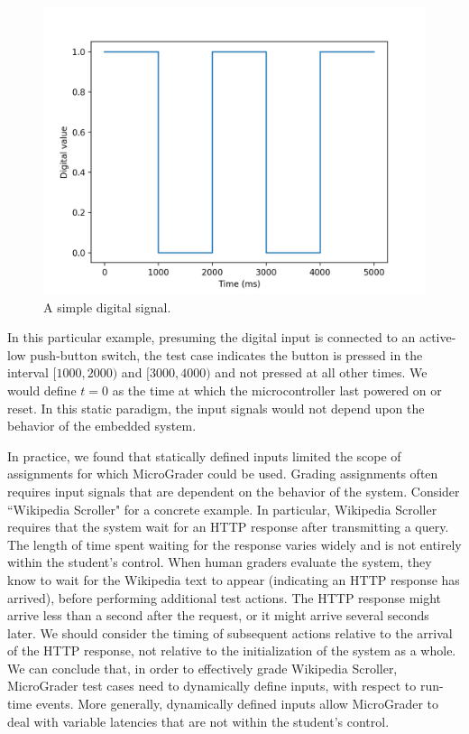 \documentclass[12pt]{article}
\begin{document}
\begin{figure}[ht]
\centering
\includegraphics[scale=0.75]{button-signal.png}
\vspace{5mm}
\caption{A simple digital signal.}
\label{fig:static-input}
\end{figure}

In this particular example, presuming the digital input is connected to an active-low push-button switch, the test case indicates the button is pressed in the interval $[1000,2000)$ and $[3000,4000)$ and not pressed at all other times.  We would define $t=0$ as the time at which the microcontroller last powered on or reset.  In this static paradigm, the input signals would not depend upon the behavior of the embedded system.

In practice, we found that statically defined inputs limited the scope of assignments for which MicroGrader could be used.  Grading assignments often requires input signals that are dependent on the behavior of the system.  Consider ``Wikipedia Scroller" for a concrete example.  In particular, Wikipedia Scroller requires that the system wait for an HTTP response after transmitting a query.  The length of time spent waiting for the response varies widely and is not entirely within the student's control.  When human graders evaluate the system, they know to wait for the Wikipedia text to appear (indicating an HTTP response has arrived), before performing additional test actions.  The HTTP response might arrive less than a second after the request, or it might arrive several seconds later.  We should consider the timing of subsequent actions relative to the arrival of the HTTP response, not relative to the initialization of the system as a whole.  We can conclude that, in order to effectively grade Wikipedia Scroller, MicroGrader test cases need to dynamically define inputs, with respect to run-time events.  More generally, dynamically defined inputs allow MicroGrader to deal with variable latencies that are not within the student's control.
\end{document}

